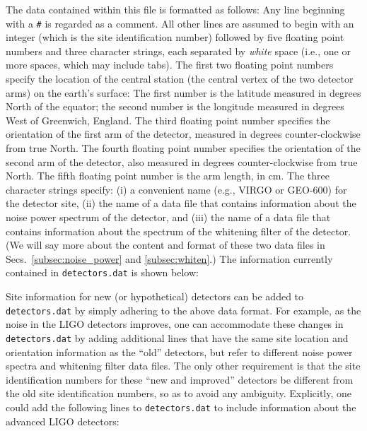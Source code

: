 The data contained within this file is formatted as follows:
Any line beginning with a {\tt \#} is regarded as a comment.
All other lines are assumed to begin with an integer (which is the site 
identification number) followed by five floating point numbers and three
character strings, each separated by {\it white} space 
(i.e., one or more spaces, which may include tabs).
The first two floating point numbers specify the location of the central 
station (the central vertex of the two detector arms) on the earth's surface:
The first number is the latitude measured in degrees North of the equator; 
the second number is the longitude measured in degrees West of Greenwich, 
England.
The third floating point number specifies the orientation of the first 
arm of the detector, measured in degrees counter-clockwise from true North.
The fourth floating point number specifies the orientation of the second 
arm of the detector, also measured in degrees counter-clockwise from true 
North.
The fifth floating point number is the arm length, in cm.
The three character strings specify: 
(i) a convenient name (e.g., VIRGO or GEO-600) for the detector site, 
(ii) the name of a data file that contains information about the noise 
power spectrum of the detector, and 
(iii) the name of a data file that contains information about the 
spectrum of the whitening filter of the detector.
(We will say more about the content and format of these two data 
files in Secs.~\ref{subsec:noise_power} and \ref{subsec:whiten}.)
The information currently contained in {\tt detectors.dat} is shown
below:



Site information for new (or hypothetical) detectors can be added to 
{\tt detectors.dat} by simply adhering to the above data format.
For example, as the noise in the LIGO detectors improves, one can 
accommodate these changes in {\tt detectors.dat} by adding additional 
lines that have the same site location and orientation information as 
the ``old'' detectors, but refer to different noise power spectra and 
whitening filter data files.
The only other requirement is that the site identification numbers for 
these ``new and improved'' detectors be different from the old site 
identification numbers, so as to avoid any ambiguity.
Explicitly, one could add the following lines to {\tt detectors.dat} 
to include information about the advanced LIGO detectors:

